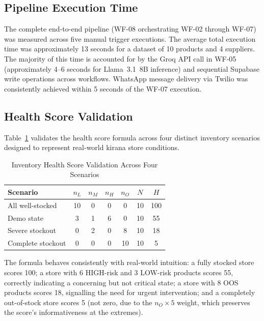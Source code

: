 \subsection{Pipeline Execution Time}

The complete end-to-end pipeline (WF-08 orchestrating WF-02 through WF-07) was measured across
five manual trigger executions. The average total execution time was approximately 13 seconds
for a dataset of 10 products and 4 suppliers. The majority of this time is accounted for by
the Groq API call in WF-05 (approximately 4--6 seconds for Llama~3.1~8B inference) and
sequential Supabase write operations across workflows. WhatsApp message delivery via Twilio
was consistently achieved within 5 seconds of the WF-07 execution.

\subsection{Health Score Validation}

Table~\ref{tab:healthscores} validates the health score formula across four distinct inventory
scenarios designed to represent real-world kirana store conditions.

\begin{table}[H]
\centering
\caption{Inventory Health Score Validation Across Four Scenarios}
\label{tab:healthscores}
{\singlespacing
\begin{tabular}{@{}l c c c c c c@{}}
\toprule
\textbf{Scenario} & $n_L$ & $n_M$ & $n_H$ & $n_O$ & $N$ & $H$ \\
\midrule
All well-stocked  & 10 & 0 & 0 & 0  & 10 & 100 \\
Demo state        & 3  & 1 & 6 & 0  & 10 & 55  \\
Severe stockout   & 0  & 2 & 0 & 8  & 10 & 18  \\
Complete stockout & 0  & 0 & 0 & 10 & 10 & 5   \\
\bottomrule
\end{tabular}
}
\end{table}

The formula behaves consistently with real-world intuition: a fully stocked store scores
100; a store with 6 HIGH-risk and 3 LOW-risk products scores 55, correctly indicating a
concerning but not critical state; a store with 8 OOS products scores 18, signalling the
need for urgent intervention; and a completely out-of-stock store scores 5 (not zero, due
to the $n_O \times 5$ weight, which preserves the score's informativeness at the extremes).

